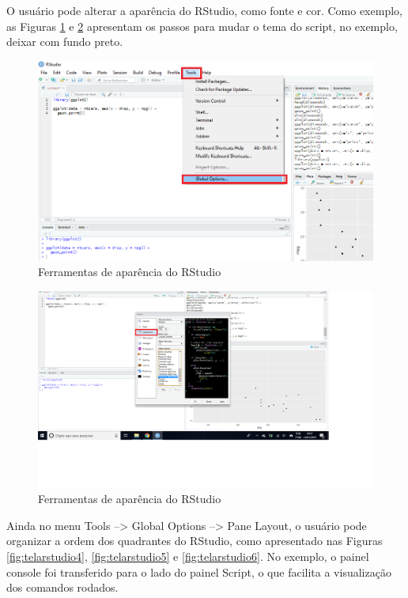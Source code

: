 \documentclass[
]{book}
\begin{document}
O usuário pode alterar a aparência do RStudio, como fonte e cor. Como exemplo, as Figuras \ref{fig:telarstudio2} e \ref{fig:telarstudio3} apresentam os passos para mudar o tema do script, no exemplo, deixar com fundo preto.

\begin{figure}
\includegraphics[width=1\linewidth]{figures/rstudio2} \caption{\label{fig:rstudio2} Ferramentas de aparência do RStudio}\label{fig:telarstudio2}
\end{figure}

\begin{figure}
\includegraphics[width=1\linewidth]{figures/rstudio3} \caption{\label{fig:rstudio3} Ferramentas de aparência do RStudio}\label{fig:telarstudio3}
\end{figure}

Ainda no menu Tools --\textgreater{} Global Options --\textgreater{} Pane Layout, o usuário pode organizar a ordem dos quadrantes do RStudio, como apresentado nas Figuras \ref{fig:telarstudio4}, \ref{fig:telarstudio5} e \ref{fig:telarstudio6}. No exemplo, o painel console foi transferido para o lado do painel Script, o que facilita a visualização dos comandos rodados.
\end{document}
